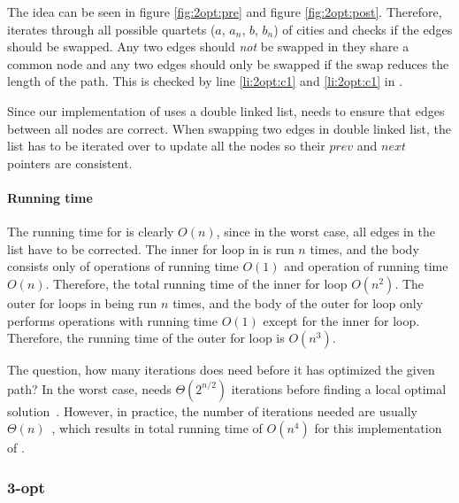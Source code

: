 The idea can be seen in figure \ref{fig:2opt:pre} and figure
\ref{fig:2opt:post}. Therefore,  iterates through all possible
quartets ($a$, $a_n$, $b$, $b_n$) of cities and checks if the edges should be
swapped. Any two edges should \emph{not} be swapped in they share a common
node and any two edges should only be swapped if the swap reduces the length of
the path. This is checked by line \ref{li:2opt:c1} and \ref{li:2opt:c1} in
.

Since our implementation of  uses a double linked list,
 needs to ensure that edges between all nodes are correct. When
swapping two edges in double linked list, the list has to be iterated over to 
update all the nodes so their $prev$ and $next$ pointers are consistent.

\paragraph{Running time}
The running time for  is clearly $O(n)$, since in the worst case,
all edges in the list have to be corrected. The inner for loop in 
is run $n$ times, and the body consists only of operations of running time
$O(1)$ and  operation of running time $O(n)$. Therefore, the total
running time of the inner for loop $O(n^2)$. The outer for loops in being run
$n$ times, and the body of the outer for loop only performs operations with
running time $O(1)$ except for the inner for loop. Therefore, the running time
of the outer for loop is $O(n^3)$.

The question, how many iterations does  need before it has
optimized the given path? In the worst case,  needs
$\Theta(2^{n/2})$ iterations before finding a local optimal
solution~\cite{johnson}. However, in practice, the number of iterations needed
are usually $\Theta(n)$~\cite{hastad}, which results in total running time of
$O(n^4)$ for this implementation of .

\subsubsection{3-opt}
\label{sec:3-opt}
